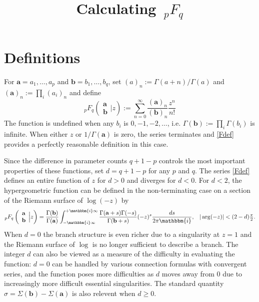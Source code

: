 \documentclass[12pt]{article}
\author{}
\title{Calculating $\, _{p}F_{q}$}
\date{}
\newcommand{\ii}[0] {\mathbbm{i}}
\numberwithin{equation}{section}
\newcommand{\FF}[6] {{}_{#1}{#2}_{#3} \left( \begin{array}{c} #4 \\ #5 \end{array} \Big| {#6}  \right)}
\newcommand{\FFf}[5] {{}_{#1}{#2}_{#3} \left(#4 | {#5} \right)}
\newcommand{\bfa}[0] {\mathbf{a}}
\newcommand{\bfb}[0] {\mathbf{b}}
\begin{document}
\maketitle



\section{Definitions}
For $\mathbf{a}=a_1,\dots,a_p$ and  $\mathbf{b}=b_1,\dots,b_q$, set $(a)_n := \Gamma(a+n)/\Gamma(a)$ and $(\mathbf{a})_n := \prod_i (a_i)_n$ and define
\begin{equation}
\label{Fdef}
\FF{p}{F}{q}{\mathbf{a}}{\mathbf{b}}{z} := \sum_{n=0}^{\infty} \frac{(\mathbf{a})_n}{(\mathbf{b})_n} \frac{z^n}{n!}
\end{equation}
The function is undefined when any $b_i$ is $0,-1,-2,\dots$, i.e. $\Gamma(\mathbf{b}) := \prod_i \Gamma(b_i)$ is infinite. When either $z$ or $1/\Gamma(\bfa)$ is zero, the series terminates and \eqref{Fdef} provides a perfectly reasonable definition in this case.

Since the difference in parameter counts $q+1-p$ controls the most important properties of these functions, set $d=q+1-p$ for any $p$ and $q$. The series \eqref{Fdef} defines an entire function of $z$ for $d > 0$ and diverges for $d<0$. For $d<2$, the hypergeometric function can be defined in the non-terminating case on a section of the Riemann surface of $\log(-z)$ by
\begin{equation}
\label{mbint}
\FF{p}{F}{q}{\mathbf{a}}{\mathbf{b}}{z} = \frac{\Gamma(\mathbf{b})}{\Gamma(\mathbf{a})} \int_{-\ii \infty}^{+\ii \infty} \frac{\Gamma(\mathbf{a}+s) \Gamma(-s)}{\Gamma(\mathbf{b}+s)} (-z)^s \frac{ds}{2\pi \ii}\text{,} \quad |\arg(-z)| < (2-d) \tfrac{\pi}{2}\text{.}
\end{equation}
When $d=0$ the branch structure is even richer due to a singularity at $z=1$ and the Riemann surface of $\log$ is no longer sufficient to describe a branch. The integer $d$ can also be viewed as a measure of the difficulty in evaluating the function: $d=0$ can be handled by various connection formulas with convergent series, and the function poses more difficulties as $d$ moves away from $0$ due to increasingly more difficult essential singularities. The standard quantity
$\sigma = \Sigma(\mathbf{b}) - \Sigma(\mathbf{a})$ is also relevent when $d \ge 0$.
\end{document}

